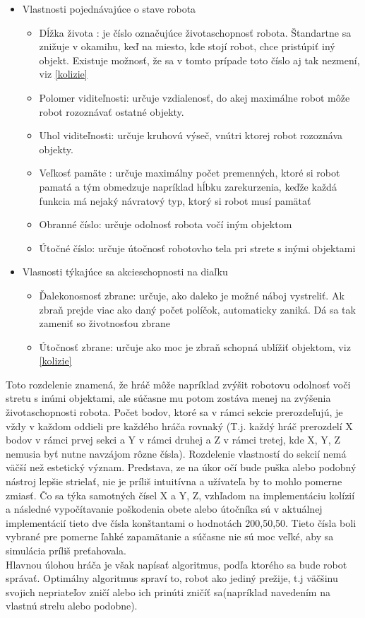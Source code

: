\begin{itemize}
\item Vlastnosti pojednávajúce o stave robota
\begin{itemize} 
\item Dĺžka života : je číslo označujúce životaschopnosť robota. Štandartne sa znižuje v okamihu, keď na miesto, kde stojí robot, chce pristúpiť iný objekt. Existuje možnosť, že sa v tomto prípade toto číslo aj tak nezmení, viz \ref{kolizie} 
\item Polomer viditeľnosti: určuje vzdialenosť, do akej maximálne robot môže robot rozoznávať ostatné objekty.
\item Uhol viditeľnosti: určuje kruhovú výseč, vnútri ktorej robot rozoznáva objekty.
\item Veľkosť pamäte : určuje maximálny počet premenných, ktoré si robot pamatá a tým obmedzuje napríklad hĺbku zarekurzenia, keďže každá funkcia má nejaký návratový typ, ktorý si robot musí pamätať
\end{itemize}
\begin{itemize}
\item Obranné číslo: určuje odolnosť robota vočí iným objektom
\item Útočné číslo: určuje útočnosť robotovho tela pri strete s inými objektami
\end{itemize}
\item Vlasnosti týkajúce sa akcieschopnosti na diaľku
\begin{itemize}
\item Ďalekonosnosť zbrane: určuje, ako daleko je možné náboj vystreliť. Ak zbraň prejde viac ako daný počet políčok, automaticky zaniká. Dá sa tak zameniť so životnosťou zbrane
\item Útočnosť zbrane: určuje ako moc je zbraň schopná ublížiť objektom, viz \ref{kolizie}
\end{itemize}
\end{itemize}
Toto rozdelenie znamená, že hráč môže napríklad zvýšit robotovu odolnosť voči stretu s inúmi objektami, ale súčasne mu potom zostáva menej na zvýšenia životaschopnosti robota. Počet bodov, ktoré sa v rámci sekcie prerozdeľujú, je vždy v každom oddieli pre každého hráča rovnaký (T.j. každý hráč prerozdelí X bodov v rámci prvej sekci a  Y v rámci druhej a Z v rámci tretej, kde X, Y, Z nemusia byť nutne navzájom rôzne čísla). Rozdelenie vlastností do sekcií nemá väčší než estetický význam. Predstava, ze na úkor očí bude puška alebo podobný nástroj lepšie strielať, nie je príliš intuitívna a užívateľa by to mohlo pomerne zmiasť. Čo sa týka samotných čísel X a Y, Z, vzhľadom na implementáciu kolízií a následné vypočítavanie poškodenia obete alebo útočníka sú v aktuálnej implementácií tieto dve čísla konštantami o hodnotách 200,50,50. Tieto čísla boli vybrané pre pomerne ľahké zapamätanie a súčasne nie sú moc veľké, aby sa simulácia príliš preťahovala.
\\Hlavnou úlohou hráča je však napísať algoritmus, podľa ktorého sa bude robot správať. Optimálny algoritmus spraví to, robot ako jediný prežije, t.j väčšinu svojich nepriateľov zničí alebo ich prinúti zničíť sa(napríklad navedením na vlastnú strelu alebo podobne).

